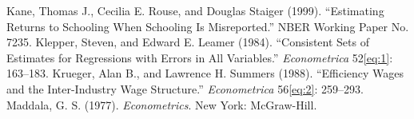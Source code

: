 \documentclass[12pt]{article}
\begin{document}
\begin{thebibliography}{99}
Kane, Thomas J., Cecilia E. Rouse, and Douglas Staiger (1999). ``Estimating Returns to Schooling When Schooling Is Misreported.'' NBER Working Paper No. 7235.
Klepper, Steven, and Edward E. Leamer (1984). ``Consistent Sets of Estimates for Regressions with Errors in All Variables.'' \textit{Econometrica} 52\eqref{eq:1}: 163--183.
Krueger, Alan B., and Lawrence H. Summers (1988). ``Efficiency Wages and the Inter-Industry Wage Structure.'' \textit{Econometrica} 56\eqref{eq:2}: 259--293.
Maddala, G. S. (1977). \textit{Econometrics}. New York: McGraw-Hill.
\end{thebibliography}
\end{document}
